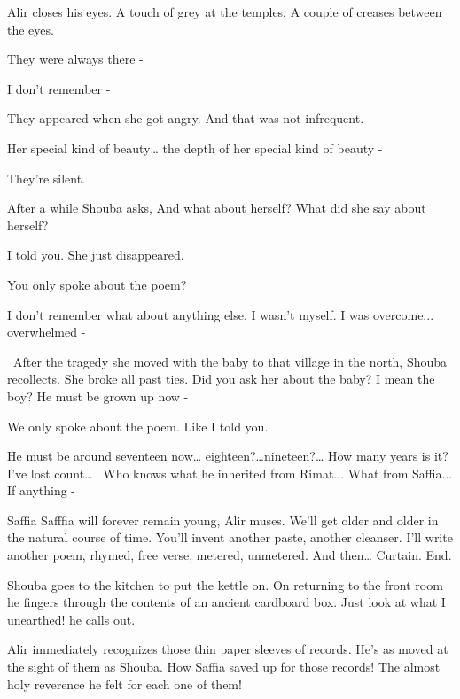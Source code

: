 \documentclass[12pt]{book}
\begin{document}
Alir closes his eyes. {\textquotedbl}A touch of grey at the temples. A couple of creases between the
eyes.{\textquotedbl}

{\textquotedbl}They were always there -{\textquotedbl}~

{\textquotedbl}I don't remember -{\textquotedbl}

{\textquotedbl}They appeared when she got angry. And that was not infrequent.{\textquotedbl}

{\textquotedbl}Her special kind of beauty{\dots} the depth of her special kind of beauty -{\textquotedbl}

They're silent.

After a while Shouba asks, {\textquotedbl}And what about herself? What did she say about herself?{\textquotedbl}

{\textquotedbl}I told you. She just disappeared.{\textquotedbl}

{\textquotedbl}You only spoke about the poem?{\textquotedbl}

{\textquotedbl}I don't remember what about anything else. I wasn't myself. I was overcome... overwhelmed
-{\textquotedbl}

~{\textquotedbl}After the tragedy she moved with the baby to that village in the north,{\textquotedbl} Shouba
recollects. {\textquotedbl}She broke all past ties. Did you ask her about the baby? I mean the boy? He must be grown up
now - {\textquotedbl}

{\textquotedbl}We only spoke about the poem. Like I told you.{\textquotedbl}

{\textquotedbl}He must be around seventeen now{\dots} eighteen?{\dots}nineteen?{\dots} How many years is it? I've lost
count{\dots} ~Who knows what he inherited from Rimat... What from Saffia... If anything -{\textquotedbl}

{\textquotedbl}Saffia Safffia will forever remain young,{\textquotedbl} Alir muses. {\textquotedbl}We'll get older and
older in the natural course of time. You'll invent another paste, another cleanser. I'll write another poem, rhymed,
free verse, metered, unmetered. And then{\dots} Curtain. End.{\textquotedbl}

Shouba goes to the kitchen to put the kettle on. On returning to the front room he fingers through the contents of an
ancient cardboard box. {\textquotedbl}Just look at what I unearthed!{\textquotedbl} he calls out.

Alir immediately recognizes those thin paper sleeves of records. He's as moved at the sight of them as Shouba.
{\textquotedbl}How Saffia saved up for those records! The almost holy reverence he felt for each one of
them!{\textquotedbl}
\end{document}
